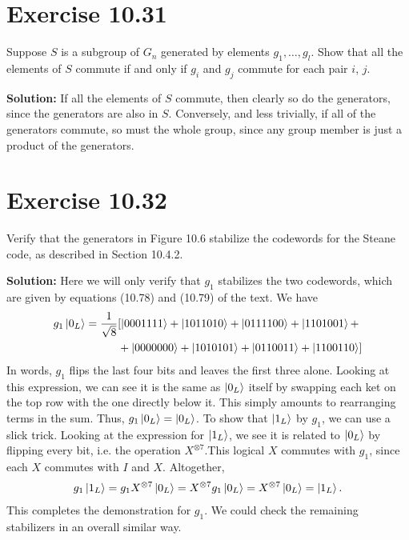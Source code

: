 \documentclass{book}
\begin{document}
\section*{Exercise 10.31}
    Suppose $S$ is a subgroup of $G_n$ generated by elements $g_1,\dots, g_l$. Show that all the elements of $S$ commute if and only if $g_i$ and $g_j$ commute for each pair $i$, $j$.
    
    \textbf{Solution:} If all the elements of $S$ commute, then clearly so do the generators, since the generators are also in $S$. Conversely, and less trivially, if all of the generators commute, so must the whole group, since any group member is just a product of the generators.
    
\section*{Exercise 10.32}
    Verify that the generators in Figure 10.6 stabilize the codewords for the Steane code, as described in Section 10.4.2.
    
    \textbf{Solution:} Here we will only verify that $g_1$ stabilizes the two codewords, which are given by equations (10.78) and (10.79) of the text. We have
    \begin{align}
    \begin{aligned}
        g_1\ket{0_L} = \frac{1}{\sqrt{8}}&[\ket{0001111}+\ket{1011010}+\ket{0111100}+\ket{1101001} + \\
        &+\ket{0000000}+\ket{1010101}+\ket{0110011}+\ket{1100110}] \\
    \end{aligned}
    \end{align}
    In words, $g_1$ flips the last four bits and leaves the first three alone. Looking at this expression, we can see it is the same as $\ket{0_L}$ itself by swapping each ket on the top row with the one directly below it. This simply amounts to rearranging terms in the sum. Thus, $g_1\ket{0_L} = \ket{0_L}$. To show that $\ket{1_L}$ by $g_1$, we can use a slick trick. Looking at the expression for $\ket{1_L}$, we see it is related to $\ket{0_L}$ by flipping every bit, i.e. the operation $X^{\otimes 7}$.This logical $X$ commutes with $g_1$, since each $X$ commutes with $I$ and $X$. Altogether,
    \begin{align}
        g_1\ket{1_L} = g_1 X^{\otimes 7}\ket{0_L} = X^{\otimes 7} g_1 \ket{0_L} = X^{\otimes 7} \ket{0_L} = \ket{1_L}.
    \end{align}
    This completes the demonstration for $g_1$. We could check the remaining stabilizers in an overall similar way.
    
\end{document}
